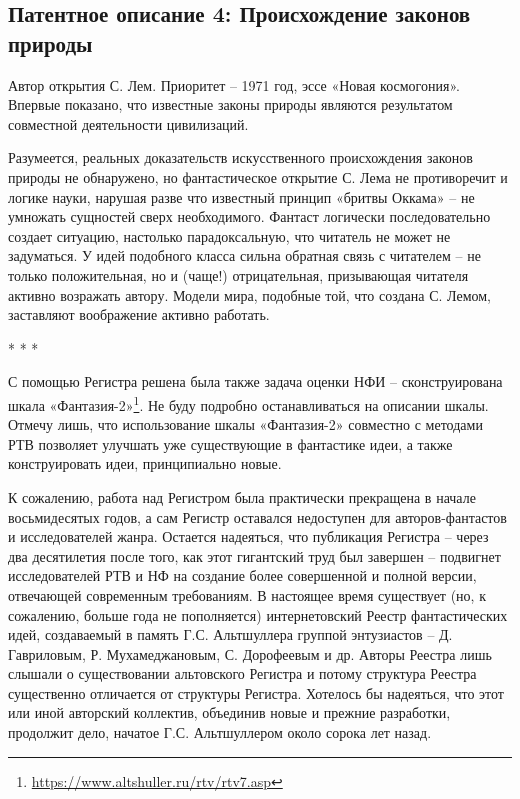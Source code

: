 \documentclass[11pt,a4paper]{article}
\begin{document}
\subsection*{Патентное описание 4: Происхождение законов природы}
Автор открытия С. Лем. Приоритет -- 1971 год, эссе «Новая космогония».
Впервые показано, что известные законы природы являются результатом совместной
деятельности цивилизаций.

Разумеется, реальных доказательств искусственного происхождения законов
природы не обнаружено, но фантастическое открытие С. Лема не противоречит и
логике науки, нарушая разве что известный принцип «бритвы Оккама» -- не
умножать сущностей сверх необходимого. Фантаст логически последовательно
создает ситуацию, настолько парадоксальную, что читатель не может не
задуматься. У идей подобного класса сильна обратная связь с читателем -- не
только положительная, но и (чаще!) отрицательная, призывающая читателя активно
возражать автору. Модели мира, подобные той, что создана С. Лемом, заставляют
воображение активно работать.

\begin{center}
  * * *
\end{center}
С помощью Регистра решена была также задача оценки НФИ -- сконструирована
шкала «Фантазия-2»\footnote{\url{https://www.altshuller.ru/rtv/rtv7.asp}}. Не
буду подробно останавливаться на описании шкалы. Отмечу лишь, что
использование шкалы «Фантазия-2» совместно с методами РТВ позволяет улучшать
уже существующие в фантастике идеи, а также конструировать идеи, принципиально
новые.

К сожалению, работа над Регистром была практически прекращена в начале
восьмидесятых годов, а сам Регистр оставался недоступен для авторов-фантастов
и исследователей жанра. Остается надеяться, что публикация Регистра -- через
два десятилетия после того, как этот гигантский труд был завершен -- подвигнет
исследователей РТВ и НФ на создание более совершенной и полной версии,
отвечающей современным требованиям. В настоящее время существует (но, к
сожалению, больше года не пополняется) интернетовский Реестр фантастических
идей, создаваемый в память Г.С. Альтшуллера группой энтузиастов --
Д. Гавриловым, Р. Мухамеджановым, С. Дорофеевым и др. Авторы Реестра лишь
слышали о существовании альтовского Регистра и потому структура Реестра
существенно отличается от структуры Регистра. Хотелось бы надеяться, что этот
или иной авторский коллектив, объединив новые и прежние разработки, продолжит
дело, начатое Г.С. Альтшуллером около сорока лет назад.
\end{document}
